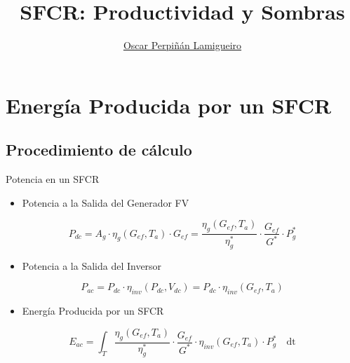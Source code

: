 \documentclass[aspectratio=169, usenames,svgnames,dvipsnames]{beamer}
\author{\href{https://oscarperpinan.github.io}{Oscar Perpiñán Lamigueiro}}
\date{}
\title{SFCR: Productividad y Sombras}
\institute[UPM]{Universidad Politécnica de Madrid}
\begin{document}
\maketitle

\section{Energía Producida por un SFCR}
\label{sec:org89f3fe4}

\subsection{Procedimiento de cálculo}
\label{sec:orgdfe819c}

\begin{frame}[label={sec:org44e7e0f}]{Potencia en un SFCR}
\begin{itemize}
\item \alert{Potencia} a la Salida del Generador FV
\end{itemize}

$$P_{dc} = A_g \cdot \eta_g(G_{ef}, T_a) \cdot  G_{ef} = %
      \frac{\eta_g(G_{ef}, T_a)}{\eta_g^*} \cdot \frac{G_{ef}}{G^*} \cdot P_g^*$$

\begin{itemize}
\item \alert{Potencia} a la Salida del Inversor
\end{itemize}

$$P_{ac} = P_{dc} \cdot \eta_{inv}(P_{dc}, V_{dc}) =  P_{dc} \cdot \eta_{inv}(G_{ef}, T_a)$$

\begin{itemize}
\item \alert{Energía} Producida por un SFCR
\end{itemize}

$$E_{ac} = \int_T \frac{\eta_g(G_{ef}, T_a)}{\eta_g^*} \cdot
      \frac{G_{ef}}{G^*} \cdot \eta_{inv}(G_{ef}, T_a) \cdot P_g^*\quad \mathrm{dt}$$
\end{frame}
\end{document}
